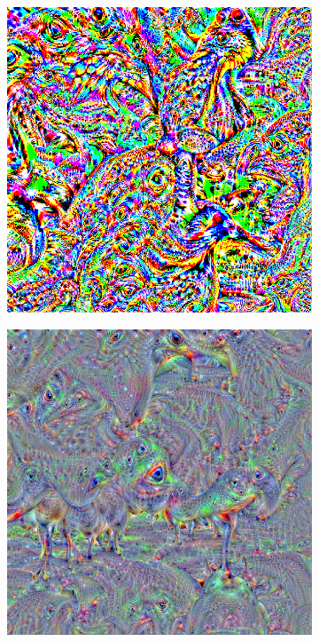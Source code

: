\begin{figure}
    \captionsetup{justification=centering}

    \begin{subfigure}[t]{0.31\textwidth}
        \captionsetup{justification=centering}
        \centering
        \includegraphics[width=.7\linewidth]{figuras/feat_vis/experiments/final/l12/random_image_pl4_lr4e-1_layer26_no-blur.png}
        \caption{}
    \end{subfigure}
    \hfill
    \begin{subfigure}[t]{0.31\textwidth}
        \captionsetup{justification=centering}
        \centering
        \includegraphics[width=.7\linewidth]{figuras/feat_vis/experiments/final/l12/random_image_pl4_lr4e-2_layer26_no-blur.png}
        \caption{}
    \end{subfigure}

\end{figure}
